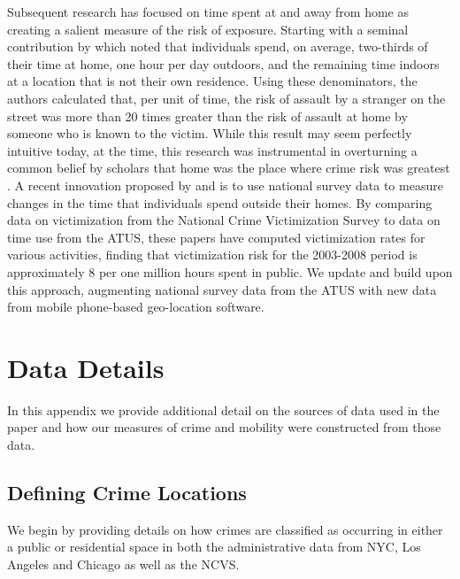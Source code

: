 Subsequent research has focused on time spent at and away from home as creating a salient measure of the risk of exposure. Starting with a seminal contribution by \citet{cohen1979social} which noted that individuals spend, on average, two-thirds of their time at home, one hour per day outdoors, and the remaining time indoors at a location that is not their own residence. Using these denominators, the authors calculated that, per unit of time, the risk of assault by a stranger on the street was more than 20 times greater than the risk of assault at home by someone who is known to the victim. While this result may seem perfectly intuitive today, at the time, this research was instrumental in overturning a common belief by scholars that home was the place where crime risk was greatest \citep{vaughan2020promise}. A recent innovation proposed by \citet{vaughan2020promise} and \citet{lemieux2012risk} is to use national survey data to measure changes in the time that individuals spend outside their homes. By comparing data on victimization from the National Crime Victimization Survey to data on time use from the ATUS, these papers have computed victimization rates for various activities, finding that victimization risk for the 2003-2008 period is approximately 8 per one million hours spent in public. We update and build upon this approach, augmenting national survey data from the ATUS with new data from mobile phone-based geo-location software.

\newpage 
\section{Data Details} \label{sec:safegraph_deets}
In this appendix we provide additional detail on the sources of data used in the paper and how our measures of crime and mobility were constructed from those data. 

\subsection{Defining Crime Locations}
We begin by providing details on how crimes are classified as occurring in either a public or residential space in both the administrative data from NYC, Los Angeles and Chicago as well as the NCVS.

